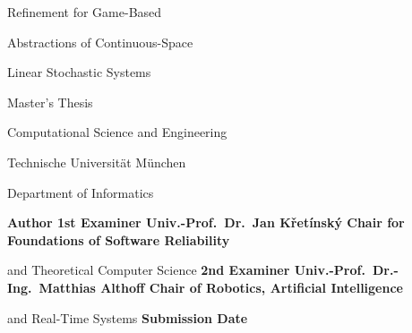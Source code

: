\startalignment[flushright]
    \dontleavehmode
\stopalignment

\blank[35mm]

{ \CoverTitleFont
    \strut Refinement for Game-Based\blank[4mm]
    \strut Abstractions of Continuous-Space \blank[4mm]
    \strut Linear Stochastic Systems
}

\blank[55mm]

Master's Thesis

Computational Science and Engineering

Technische Universität München

Department of Informatics

\blank[20mm]

\starttable[s0|lp(45mm)|lp(115mm)|]
    \NC \bf Author \NC \Author \NC \AR
    \SR
    \NC \bf 1st Examiner \NC Univ.-Prof.\ Dr.\ Jan Křetínský \NC \AR
    \NC \NC Chair for Foundations of Software Reliability \par and Theoretical Computer Science \NC \AR
    \SR
    \NC \bf 2nd Examiner \NC Univ.-Prof.\ Dr.-Ing.\ Matthias Althoff \NC \AR
    \NC \NC Chair of Robotics, Artificial Intelligence \par and Real-Time Systems \NC \AR
    \SR
    \NC \bf Submission Date \NC \DateOfCompletion \NC \AR
\stoptable

